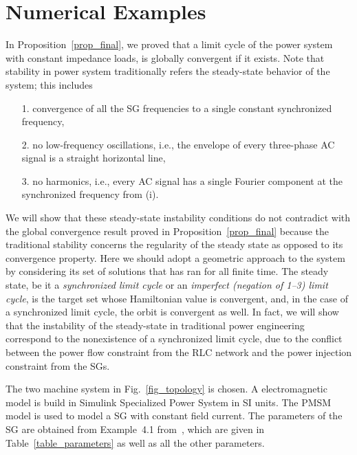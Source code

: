 \section{Numerical Examples} \label{sec_test}

In Proposition~\ref{prop_final}, we proved that a limit cycle of the power system with constant impedance loads, is globally convergent if it exists. Note that stability in power system traditionally refers the steady-state behavior of the system; this includes
\begin{enumerate}
    \item[1.] convergence of all the SG frequencies to a single constant synchronized frequency,
    \item[2.] no low-frequency oscillations, i.e., the envelope of every three-phase AC signal is a straight horizontal line,
    \item[3.] no harmonics, i.e., every AC signal has a single Fourier component at the synchronized frequency from (i).
\end{enumerate}
We will show that these steady-state instability conditions do not contradict with the global convergence result proved in Proposition~\ref{prop_final} because the traditional stability concerns the regularity of the steady state as opposed to its convergence property. Here we should adopt a geometric approach to the system by considering its set of solutions that has ran for all finite time. The steady state, be it a \emph{synchronized limit cycle} or an \emph{imperfect (negation of 1--3) limit cycle}, is the target set whose Hamiltonian value is convergent, and, in the case of a synchronized limit cycle, the orbit is convergent as well.
In fact, we will show that the instability of the steady-state in traditional power engineering correspond to the nonexistence of a synchronized limit cycle, due to the conflict between the power flow constraint from the RLC network and the power injection constraint from the SGs.

The two machine system in Fig.~\ref{fig_topology} is chosen. A electromagnetic model is build in Simulink Specialized Power System in SI units. The PMSM model is used to model a SG with constant field current. The parameters of the SG are obtained from Example~4.1 from~\cite{vittal2019power}, which are given in Table~\ref{table_parameters} as well as all the other parameters. %



